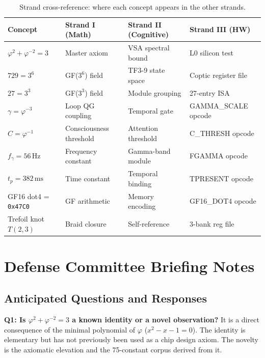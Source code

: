 \begin{table}[h]
\centering
\caption{Strand cross-reference: where each concept appears in the other strands.}
\label{tab:strand-xref}
\begin{tabular}{p{3cm}p{3cm}p{3cm}p{3cm}}
\hline
Concept & Strand I (Math) & Strand II (Cognitive) & Strand III (HW) \\
\hline
\(\varphi^2+\varphi^{-2}=3\) & Master axiom & VSA spectral bound & L0 silicon test \\
\(729 = 3^6\) & GF(\(3^6\)) field & TF3-9 state space & Coptic register file \\
\(27 = 3^3\) & GF(\(3^3\)) field & Module grouping & 27-entry ISA \\
\(\gamma = \varphi^{-3}\) & Loop QG coupling & Temporal gate & GAMMA\_SCALE opcode \\
\(C = \varphi^{-1}\) & Consciousness threshold & Attention threshold & C\_THRESH opcode \\
\(f_\gamma = 56\,\text{Hz}\) & Frequency constant & Gamma-band module & FGAMMA opcode \\
\(t_p = 382\,\text{ms}\) & Time constant & Temporal binding & TPRESENT opcode \\
GF16 dot4 = \texttt{0x47C0} & GF arithmetic & Memory encoding & GF16\_DOT4 opcode \\
Trefoil knot \(T(2,3)\) & Braid closure & Self-reference & 3-bank reg file \\
\hline
\end{tabular}
\end{table}


\section{Defense Committee Briefing Notes}
\label{sec:flos74-defense}

\subsection{Anticipated Questions and Responses}

\textbf{Q1: Is \(\varphi^2 + \varphi^{-2} = 3\) a known identity or a novel
observation?}
It is a direct consequence of the minimal polynomial of \(\varphi\)
(\(x^2 - x - 1 = 0\)).
The identity is elementary but has not previously been used as a chip design
axiom.
The novelty is the axiomatic elevation and the 75-constant corpus derived
from it.

